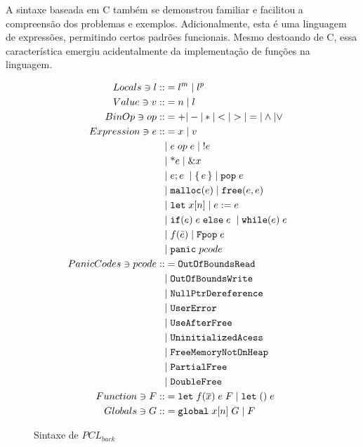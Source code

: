 A sintaxe baseada em C também se demonstrou familiar e facilitou a compreensão dos problemas e exemplos. Adicionalmente, esta é uma linguagem de expressões, permitindo certos padrões funcionais. Mesmo destoando de C, essa característica emergiu acidentalmente da implementação de funções na linguagem. 
\begin{figure*}[ht]
	\caption{Sintaxe de $PCL_{back}$}
	\label{fig:pclback:sintax}
	\begingroup
		\begin{align*}
			Locals \ni l ::&= l^m \;|\; l^p &&\\ 
			Value \ni v ::&= n \;|\; l && \\
			BinOp \ni op ::&= + | - | * | < | > | = | \land | \lor \\
			Expression \ni e ::&= x \;|\; v \\
			&|\; e\; op\; e \;|\; !e  \\
			&|\; \text{*}e \;|\; \&x \\
			&|\; e;e \; \;|\; \{\,e\,\} \;|\; \texttt{pop}\;e\; \\ 
			&|\; \texttt{malloc}(e) \;|\; \texttt{free}(e, e) \; \\ 
			&|\; \texttt{let}\; x[n] \;|\; e := e \; \\
			&|\; \texttt{if}(e) \; e \; \texttt{else} \; e \; \;|\; \texttt{while}(e) \; e \\
			&|\; f(\bar e) \;|\; \texttt{Fpop}\;e\\ 
			&|\; \texttt{panic}\;pcode \\ 
			PanicCodes \ni pcode ::&= \texttt{OutOfBoundsRead}\\
			&|\; \texttt{OutOfBoundsWrite}\\
			&|\; \texttt{NullPtrDereference}\\
			&|\; \texttt{UserError}\\
			&|\; \texttt{UseAfterFree}\\
			&|\; \texttt{UninitializedAcess}\\
			&|\; \texttt{FreeMemoryNotOnHeap}\\
			&|\; \texttt{PartialFree}\\
			&|\; \texttt{DoubleFree}\\
			Function \ni F ::&= \texttt{let} \; f(\overline{x})\; e \; F \; | \; \texttt{let}\;() \; e \\
			Globals \ni G ::&= \texttt{global}\; x[n] \;G \;|\; F
		\end{align*}
	\endgroup
\end{figure*}
\FloatBarrier

